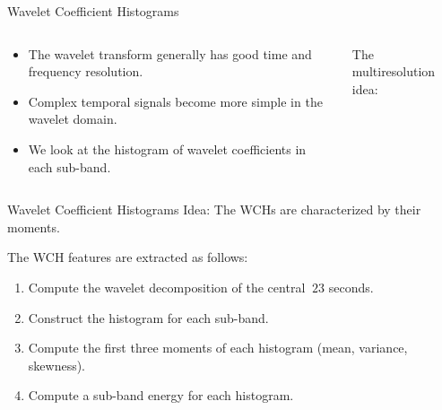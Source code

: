 \documentclass[xcolor=dvipsnames,t]{beamer} %
\begin{document}
\begin{frame}{Wavelet Coefficient Histograms}
   \begin{columns}[T,onlytextwidth]
      \begin{column}{0.45\textwidth}
         \begin{itemize}
            \item The wavelet transform generally has good time and frequency resolution.
            \item Complex temporal signals become more simple in the wavelet domain.
            \item We look at the histogram of wavelet coefficients in each sub-band.
         \end{itemize}

      \end{column}

      \begin{column}{0.45\textwidth}
         The multiresolution idea:\\[1em]
      \end{column}
   \end{columns}
\end{frame}

\begin{frame}{Wavelet Coefficient Histograms}
   Idea: The WCHs are characterized by their moments.

   The WCH features are extracted as follows:
   \begin{enumerate}
      \item Compute the wavelet decomposition of the central $~23$ seconds.
      \item Construct the histogram for each sub-band.
      \item Compute the first three moments of each histogram (mean, variance, skewness).
      \item Compute a sub-band energy for each histogram.
   \end{enumerate}

\end{frame}
\end{document}
